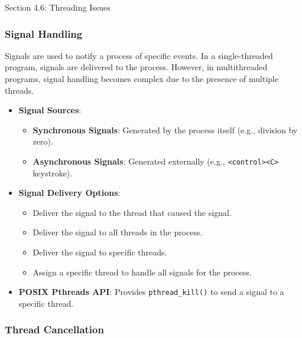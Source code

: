 \begin{notes}{Section 4.6: Threading Issues}
\begin{highlight}
    \end{highlight}
    
    \subsubsection*{Signal Handling}
    
    Signals are used to notify a process of specific events. In a single-threaded program, signals are delivered to the process. However, in multithreaded programs, signal handling becomes complex due 
    to the presence of multiple threads.
    
    \begin{highlight}
    
        \begin{itemize}
            \item \textbf{Signal Sources}:
                \begin{itemize}
                    \item \textbf{Synchronous Signals}: Generated by the process itself (e.g., division by zero).
                    \item \textbf{Asynchronous Signals}: Generated externally (e.g., \texttt{<control><C>} keystroke).
                \end{itemize}
            \item \textbf{Signal Delivery Options}:
                \begin{itemize}
                    \item Deliver the signal to the thread that caused the signal.
                    \item Deliver the signal to all threads in the process.
                    \item Deliver the signal to specific threads.
                    \item Assign a specific thread to handle all signals for the process.
                \end{itemize}
            \item \textbf{POSIX Pthreads API}: Provides \texttt{pthread\_kill()} to send a signal to a specific thread.
        \end{itemize}
    
    \end{highlight}
    
    \subsubsection*{Thread Cancellation}
    

\end{notes}
